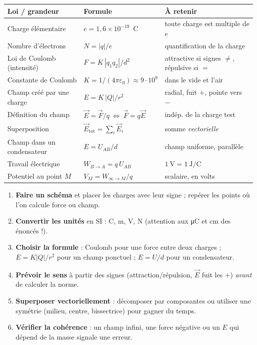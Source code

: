 \documentclass[11pt,a4paper]{article}
\newcommand{\vc}[1]{\vec{#1}}
\begin{document}
\begin{center}
\renewcommand{\arraystretch}{1.55}
\begin{tabular}{>{\raggedright\arraybackslash}p{4.7cm} >{\centering\arraybackslash}p{4.8cm} >{\raggedright\arraybackslash}p{4.7cm}}
\rowcolor{primary!18}
\textbf{Loi / grandeur} & \textbf{Formule} & \textbf{À retenir} \\
\midrule
Charge élémentaire & $e = 1{,}6\times 10^{-19}$~C & toute charge est multiple de $e$ \\
Nombre d'électrons & $N = |q|/e$ & quantification de la charge \\
Loi de Coulomb (intensité) & $F = K\,|q_1 q_2|/d^{2}$ & attractive si signes $\ne$, répulsive si $=$ \\
Constante de Coulomb & $K=1/(4\pi\varepsilon_0)\approx 9\!\cdot\!10^{9}$ & dans le vide et l'air \\
Champ créé par une charge & $E = K\,|Q|/r^{2}$ & radial, fuit $+$, pointe vers $-$ \\
Définition du champ & $\vc{E}=\vc{F}/q\ \Leftrightarrow\ \vc{F}=q\vc{E}$ & indép. de la charge test \\
Superposition & $\vc{E}_{\text{tot}}=\sum_i\vc{E}_i$ & somme \emph{vectorielle} \\
Champ dans un condensateur & $E = U_{AB}/d$ & champ uniforme, parallèle \\
Travail électrique & $W_{B\to A}=q\,U_{AB}$ & $1~\mathrm{V}=1~\mathrm{J/C}$ \\
Potentiel au point $M$ & $V_M = W_{\infty\to M}/q$ & scalaire, en volts \\
\bottomrule
\end{tabular}
\end{center}

\begin{methode}
\begin{enumerate}[leftmargin=1.8em,topsep=2pt,itemsep=1pt]
  \item \textbf{Faire un schéma} et placer les charges avec leur signe ; repérer les points où
        l'on calcule force ou champ.
  \item \textbf{Convertir les unités} en SI : C, m, V, N (attention aux \si{\micro\coulomb} et
        \si{\centi\metre} des énoncés !).
  \item \textbf{Choisir la formule} : Coulomb pour une force entre deux charges ;
        $E=K|Q|/r^{2}$ pour un champ ponctuel ; $E=U/d$ pour un condensateur.
  \item \textbf{Prévoir le sens} à partir des signes (attraction/répulsion, $\vc{E}$ fuit les $+$)
        \emph{avant} de calculer la norme.
  \item \textbf{Superposer vectoriellement} : décomposer par composantes ou utiliser une symétrie
        (milieu, centre, bissectrice) pour gagner du temps.
  \item \textbf{Vérifier la cohérence} : un champ infini, une force négative ou un $E$ qui dépend
        de la masse signale une erreur.
\end{enumerate}
\end{methode}
\end{document}
